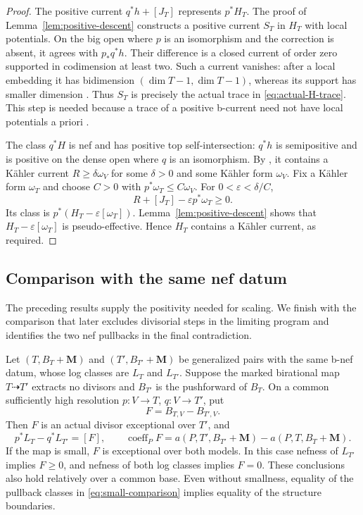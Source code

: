 \begin{proof}
The positive current $q^*h+[J_T]$ represents $p^*H_T$.
The proof of Lemma~\ref{lem:positive-descent} constructs a positive
current $S_T$ in $H_T$ with local potentials.  On the big open where
$p$ is an isomorphism and the correction is absent, it agrees with
$p_*q^*h$.  Their difference is a closed current of order zero
supported in codimension at least two.  Such a current vanishes:
after a local embedding it has bidimension
$(\dim T-1,\dim T-1)$, whereas its support has smaller dimension
\cite[Chapter~III, Corollary~2.11]{DemaillyCADG2012}.
Thus $S_T$ is precisely the actual trace in
\eqref{eq:actual-H-trace}.  This step is needed because a trace of
a positive b-current need not have local potentials a priori
\cite[Remark~2.6(ii)]{DHY2023}.

The class $q^*H$ is nef and has positive top self-intersection:
$q^*h$ is semipositive and is positive on the dense open where $q$
is an isomorphism.  By \cite[Theorem~0.5]{DemaillyPaun2004}, it contains
a K\"ahler current $R\geq\delta\omega_V$ for some $\delta>0$ and
some K\"ahler form $\omega_V$.  Fix a K\"ahler form $\omega_T$ and
choose $C>0$ with $p^*\omega_T\leq C\omega_V$.  For
$0<\varepsilon<\delta/C$,
\[
 R+[J_T]-\varepsilon p^*\omega_T\geq0.
\]
Its class is $p^*(H_T-\varepsilon[\omega_T])$.
Lemma~\ref{lem:positive-descent} shows that
$H_T-\varepsilon[\omega_T]$ is pseudo-effective.  Hence $H_T$
contains a K\"ahler current, as required.
\end{proof}

\subsection{Comparison with the same nef datum}

The preceding results supply the positivity needed for scaling.  We
finish with the comparison that later excludes divisorial steps in
the limiting program and identifies the two nef pullbacks in the
final contradiction.

\begin{lemma}\label{lem:small-comparison}
Let $(T,B_T+\mathbf M)$ and $(T',B_{T'}+\mathbf M)$ be generalized
pairs with the same b-nef datum, whose log classes are $L_T$ and
$L_{T'}$.  Suppose the marked birational map $T\dashrightarrow T'$
extracts no divisors and $B_{T'}$ is the pushforward of $B_T$.
On a common sufficiently high resolution $p:V\to T$, $q:V\to T'$, put
\[
 F=B_{T,V}-B_{T',V}.
\]
Then $F$ is an actual divisor exceptional over $T'$, and
\begin{equation}\label{eq:small-comparison}
 p^*L_T-q^*L_{T'}=[F],\qquad
 \operatorname{coeff}_P F
 =a(P,T',B_{T'}+\mathbf M)-a(P,T,B_T+\mathbf M).
\end{equation}
If the map is small, $F$ is exceptional over both models.  In this
case nefness of $L_{T'}$ implies $F\geq0$, and nefness of both log
classes implies $F=0$.  These conclusions also hold relatively over
a common base.  Even without smallness, equality of the pullback classes
in \eqref{eq:small-comparison} implies equality of the structure boundaries.
\end{lemma}

